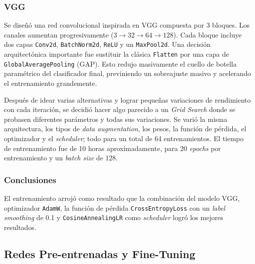\documentclass[11pt, a4paper]{article}
\begin{document}
\subsubsection{VGG}
Se diseñó una red convolucional inspirada en VGG compuesta por 3 bloques. Los canales aumentan progresivamente ($3 \rightarrow 32 \rightarrow 64 \rightarrow 128$). Cada bloque incluye dos capas \texttt{Conv2d}, \texttt{BatchNorm2d}, \texttt{ReLU} y un \texttt{MaxPool2d}. Una decisión arquitectónica importante fue sustituir la clásica \texttt{Flatten} por una capa de \texttt{GlobalAveragePooling} (GAP). Esto redujo masivamente el cuello de botella paramétrico del clasificador final, previniendo un sobreajuste masivo y acelerando el entrenamiento grandemente.

Después de idear varias alternativas y lograr pequeñas variaciones de rendimiento con cada iteración, se decidió hacer algo parecido a un \textit{Grid Search} donde se probasen diferentes parámetros y todas sus variaciones. Se varió la misma arquitectura, los tipos de \textit{data augmentation}, los pesos, la función de pérdida, el optimizador y el \textit{scheduler}; todo para un total de 64 entrenamientos. El tiempo de entrenamiento fue de 10 horas aproximadamente, para 20 \textit{epochs} por entrenamiento y un \textit{batch size} de 128.


\subsubsection{Conclusiones}
El entrenamiento arrojó como resultado que la combinación del modelo VGG, optimizador \texttt{AdamW}, la función de pérdida \texttt{CrossEntropyLoss} con un \textit{label smoothing} de 0.1 y \texttt{CosineAnnealingLR} como \textit{scheduler} logró los mejores resultados.

\subsection{Redes Pre-entrenadas y Fine-Tuning}
\end{document}
